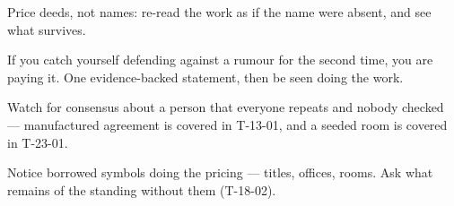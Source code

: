 \begin{countermeasures}
  \item Price deeds, not names: re-read the work as if the name were absent, and see what survives.
  \item If you catch yourself defending against a rumour for the second time, you are paying it. One evidence-backed statement, then be seen doing the work.
  \item Watch for consensus about a person that everyone repeats and nobody checked --- manufactured agreement is covered in T-13-01, and a seeded room is covered in T-23-01.
  \item Notice borrowed symbols doing the pricing --- titles, offices, rooms. Ask what remains of the standing without them (T-18-02).
\end{countermeasures}

\seesources
{}
